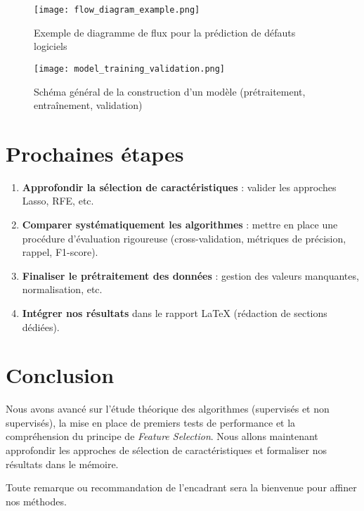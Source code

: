 \documentclass[12pt,a4paper]{report}
\begin{document}
\begin{figure}[h!]
    \centering
    \texttt{[image: flow\_diagram\_example.png]}
    \caption{Exemple de diagramme de flux pour la prédiction de défauts logiciels}
    \label{fig:flow}
\end{figure}

\begin{figure}[h!]
    \centering
    \texttt{[image: model\_training\_validation.png]}
    \caption{Schéma général de la construction d’un modèle (prétraitement, entraînement, validation)}
    \label{fig:model}
\end{figure}

\chapter{Prochaines étapes}
\begin{enumerate}
    \item \textbf{Approfondir la sélection de caractéristiques} : valider les approches Lasso, RFE, etc.
    \item \textbf{Comparer systématiquement les algorithmes} : mettre en place une procédure 
    d’évaluation rigoureuse (cross-validation, métriques de précision, rappel, F1-score).
    \item \textbf{Finaliser le prétraitement des données} : gestion des valeurs manquantes, 
    normalisation, etc.
    \item \textbf{Intégrer nos résultats} dans le rapport LaTeX (rédaction de sections dédiées).
\end{enumerate}

\chapter{Conclusion}
Nous avons avancé sur l’étude théorique des algorithmes (supervisés et non supervisés), 
la mise en place de premiers tests de performance et la compréhension du principe de 
\textit{Feature Selection}. Nous allons maintenant approfondir les approches de 
sélection de caractéristiques et formaliser nos résultats dans le mémoire. 

Toute remarque ou recommandation de l’encadrant sera la bienvenue pour affiner nos méthodes.
\end{document}
